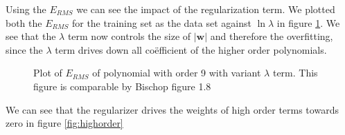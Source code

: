\documentclass[11pt]{article}
\begin{document}
Using the $E_{RMS}$ we can see the impact of the regularization term. We plotted both the $E_{RMS}$ for the training set as the data set against $\ln\lambda$ in figure \ref{fig:lambdaerror}. We see that the $\lambda$ term now controls the size of $|\textbf{w}|$ and therefore the overfitting, since the $\lambda$ term drives down all co\"efficient of the higher order polynomials.

\begin{figure}[H]
\centering
	\centering
		\caption{Plot of $E_{RMS}$ of polynomial with order 9 with variant $\lambda$ term. This figure is comparable by Bischop figure 1.8} 
	\label{fig:lambdaerror}
\end{figure}

We can see that the regularizer drives the weights of high order terms towards zero in figure \ref{fig:highorder}
\end{document}
